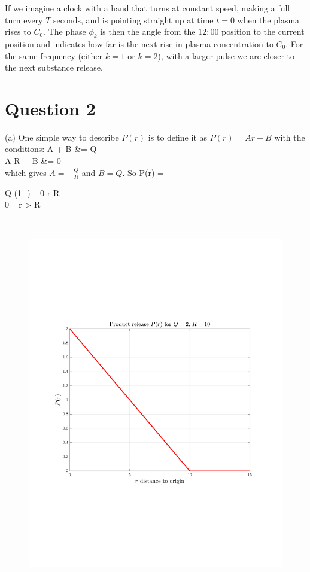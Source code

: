 \documentclass[12pt,twoside]{article}
\begin{document}
If we imagine a clock with a hand that turns at constant speed, making a full turn every $T$ seconds, and is pointing straight up at time $t=0$ when
the plasma rises to $C_0$. The phase $\phi_k$ is then the angle from the $12:00$ position to the current position and indicates how far is the next rise
in plasma concentration to $C_0$. For the same frequency (either $k=1$ or $k=2$), with a larger pulse we are closer to the next substance release.

\ee

\section*{Question 2}

\be
\item [(a)]
One simple way to describe $P(r)$ is to define it as $P(r) = A r + B$ with the conditions:
\ba
	A  + B &= Q \\
	A \cdot R + B &= 0 \\	
\ea
which gives $A=-\frac{Q}{R}$ and $B=Q$.
So
\ba
	P(r) =
	\begin{cases}
	Q (1 -) ~  0 \le r \le R\ \\
	0 ~   r > R \\
	\end{cases} \\	
\ea


\begin{figure}[H]
 \centering
 \includegraphics[scale=0.5]{pr}
\end{figure}
	
\end{document}
